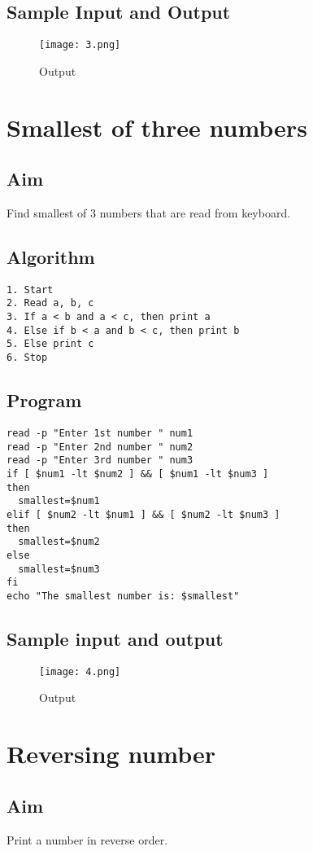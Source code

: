 \documentclass{article}
\begin{document}
\subsection{Sample Input and Output}
\begin{figure}[H]
    \centering
    \texttt{[image: 3.png]}
    \caption{Output}
    \label{fig:my_label2}
\end{figure}
\section{\Large Smallest of three numbers}
\subsection{Aim}
Find smallest of 3 numbers that are read from keyboard.
\subsection{Algorithm}
\begin{Verbatim}[tabsize = 4]
1. Start
2. Read a, b, c
3. If a < b and a < c, then print a
4. Else if b < a and b < c, then print b
5. Else print c
6. Stop
\end{Verbatim}
\thispagestyle{third}
\subsection{Program}
\begin{Verbatim}[tabsize = 4]
read -p "Enter 1st number " num1
read -p "Enter 2nd number " num2
read -p "Enter 3rd number " num3
if [ $num1 -lt $num2 ] && [ $num1 -lt $num3 ]
then
  smallest=$num1
elif [ $num2 -lt $num1 ] && [ $num2 -lt $num3 ]
then
  smallest=$num2
else
  smallest=$num3
fi
echo "The smallest number is: $smallest"

\end{Verbatim}
\subsection{Sample input and output}
\begin{figure}[H]
    \centering
    \texttt{[image: 4.png]}
    \caption{Output}
    \label{fig:my_label2}
\end{figure}
\section{\Large Reversing number}
\subsection{Aim}
Print a number in reverse order.
\end{document}
